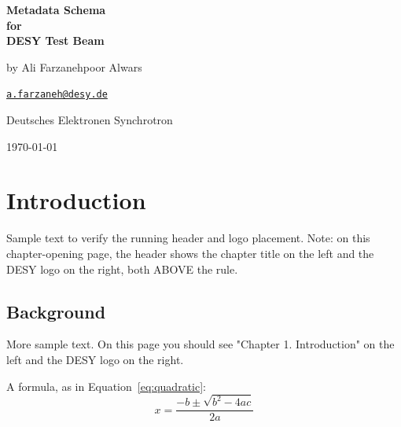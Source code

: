 \documentclass[11pt, a4paper]{report}
\begin{document}
\begin{titlepage}
    \thispagestyle{empty}
    \centering
    \vspace*{6cm}
    {\Huge\bfseries Metadata Schema \\ for \\ DESY Test Beam\par}
    \vspace{10cm}
    {\Large by Ali Farzanehpoor Alwars\par}
    \vspace{0.4cm}
    {\normalsize
    \href{mailto:a.farzaneh@desy.de}{\texttt{a.farzaneh@desy.de}}%
    \par}
    \vspace{0.4cm}
    {\normalsize Deutsches Elektronen Synchrotron\par}
    \vfill
    {\large \today\par}
\end{titlepage}


\tableofcontents
\thispagestyle{empty}



\clearpage


\chapter{Introduction}
Sample text to verify the running header and logo placement.
Note: on this chapter-opening page, the header shows the chapter
title on the left and the DESY logo on the right, both ABOVE the rule.

\section{Background}
More sample text. On this page you should see
"Chapter 1. Introduction" on the left and the DESY logo on the right.

A formula, as in Equation~\eqref{eq:quadratic}:
\begin{equation}
    x = \frac{-b \pm \sqrt{b^2 - 4ac}}{2a}
    \label{eq:quadratic}
\end{equation}
\end{document}
